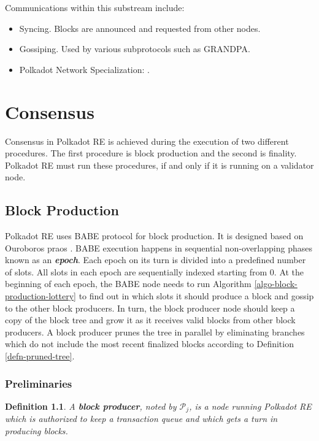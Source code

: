 \documentclass{book}
\newcommand{\tmem}[1]{{\em #1\/}}
\newcommand{\tmstrong}[1]{\textbf{#1}}
\newcommand{\tmtextbf}[1]{{\bfseries{#1}}}
\newcommand{\tmtextit}[1]{{\itshape{#1}}}
\newtheorem{definition}{Definition}
\providecommand{\tmem}[1]{\tmtextit{#1}}
\providecommand{\tmstrong}[1]{\tmtextbf{#1}}
\providecommand{\tmtextbf}[1]{\tmtextbf{#1}}
\providecommand{\tmtextit}[1]{\tmtextit{#1}}
\newtheorem{definition}{Definition}
\begin{document}
Communications within this substream include:
\begin{itemize}
  \item Syncing. Blocks are announced and requested from other nodes.
  
  \item Gossiping. Used by various subprotocols such as GRANDPA.
  
  \item Polkadot Network Specialization: {}.
\end{itemize}
\chapter{Consensus}\label{chap-consensu}

Consensus in Polkadot RE is achieved during the execution of two different
procedures. The first procedure is block production and the second is
finality. Polkadot RE must run these procedures, if and only if it is running
on a validator node.

\section{Block Production}\label{sect-babe}\label{sect-block-production}

Polkadot RE uses BABE protocol {\cite{w3f_research_group_blind_2019}} for
block production. It is designed based on Ouroboros praos
{\cite{david_ouroboros_2018}}. BABE execution happens in sequential
non-overlapping phases known as an {\tmstrong{{\tmem{epoch}}}}. Each epoch on
its turn is divided into a predefined number of slots. All slots in each epoch
are sequentially indexed starting from 0. At the beginning of each epoch, the
BABE node needs to run Algorithm \ref{algo-block-production-lottery} to find
out in which slots it should produce a block and gossip to the other block
producers. In turn, the block producer node should keep a copy of the block
tree and grow it as it receives valid blocks from other block producers. A
block producer prunes the tree in parallel by eliminating branches which do
not include the most recent finalized blocks according to Definition
\ref{defn-pruned-tree}.

\subsection{Preliminaries}

\begin{definition}
  A {\tmstrong{block producer}}, noted by $\mathcal{P}_j$, is a node running
  Polkadot RE which is authorized to keep a transaction queue and which gets a
  turn in producing blocks.
\end{definition}
\end{document}
